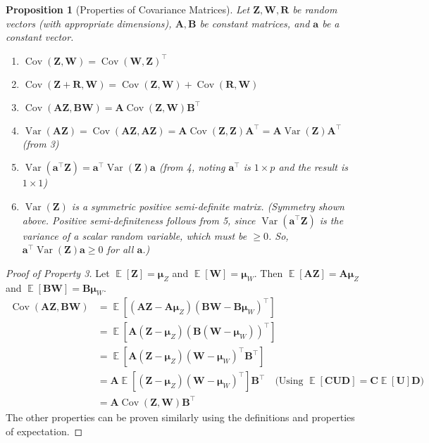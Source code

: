 \documentclass[11pt, a4paper]{article}
\DeclareMathOperator{\E}{\mathbb{E}}             %
\DeclareMathOperator{\Var}{\mathrm{Var}}         %
\DeclareMathOperator{\Cov}{\mathrm{Cov}}         %
\newtheorem{proposition}[theorem]{Proposition}
\theoremstyle{definition}
\theoremstyle{remark}
\newcommand{\mat}[1]{\mathbf{#1}}       %
\newcommand{\vect}[1]{\bm{#1}}          %
\newcommand{\transpose}{^{\top}}        %
\begin{document}
\begin{proposition}[Properties of Covariance Matrices]
Let $\vect{Z}, \vect{W}, \vect{R}$ be random vectors (with appropriate dimensions), $\mat{A}, \mat{B}$ be constant matrices, and $\vect{a}$ be a constant vector.
\begin{enumerate}
    \item $\Cov(\vect{Z}, \vect{W}) = \Cov(\vect{W}, \vect{Z})\transpose$
    \item $\Cov(\vect{Z} + \vect{R}, \vect{W}) = \Cov(\vect{Z}, \vect{W}) + \Cov(\vect{R}, \vect{W})$
    \item $\Cov(\mat{A} \vect{Z}, \mat{B} \vect{W}) = \mat{A} \Cov(\vect{Z}, \vect{W}) \mat{B}\transpose$
    \item $\Var(\mat{A} \vect{Z}) = \Cov(\mat{A}\vect{Z}, \mat{A}\vect{Z}) = \mat{A} \Cov(\vect{Z}, \vect{Z}) \mat{A}\transpose = \mat{A} \Var(\vect{Z}) \mat{A}\transpose$ (from 3)
    \item $\Var(\vect{a}\transpose \vect{Z}) = \vect{a}\transpose \Var(\vect{Z}) \vect{a}$ (from 4, noting $\vect{a}\transpose$ is $1 \times p$ and the result is $1 \times 1$)
    \item $\Var(\vect{Z})$ is a symmetric positive semi-definite matrix. (Symmetry shown above. Positive semi-definiteness follows from 5, since $\Var(\vect{a}\transpose \vect{Z})$ is the variance of a scalar random variable, which must be $\geq 0$. So, $\vect{a}\transpose \Var(\vect{Z}) \vect{a} \geq 0$ for all $\vect{a}$.)
\end{enumerate}
\end{proposition}

\begin{proof}[Proof of Property 3]
Let $\E[\vect{Z}] = \vect{\mu}_Z$ and $\E[\vect{W}] = \vect{\mu}_W$.
Then $\E[\mat{A}\vect{Z}] = \mat{A}\vect{\mu}_Z$ and $\E[\mat{B}\vect{W}] = \mat{B}\vect{\mu}_W$.
\begin{align*} \Cov(\mat{A} \vect{Z}, \mat{B} \vect{W}) &= \E\left[ (\mat{A}\vect{Z} - \mat{A}\vect{\mu}_Z) (\mat{B}\vect{W} - \mat{B}\vect{\mu}_W)\transpose \right] \\ &= \E\left[ \mat{A}(\vect{Z} - \vect{\mu}_Z) ( \mat{B}(\vect{W} - \vect{\mu}_W) )\transpose \right] \\ &= \E\left[ \mat{A}(\vect{Z} - \vect{\mu}_Z) (\vect{W} - \vect{\mu}_W)\transpose \mat{B}\transpose \right] \\ &= \mat{A} \E\left[ (\vect{Z} - \vect{\mu}_Z) (\vect{W} - \vect{\mu}_W)\transpose \right] \mat{B}\transpose \quad \text{(Using } \E[\mat{C}\mat{U}\mat{D}] = \mat{C}\E[\mat{U}]\mat{D} \text{)} \\ &= \mat{A} \Cov(\vect{Z}, \vect{W}) \mat{B}\transpose \end{align*}
The other properties can be proven similarly using the definitions and properties of expectation.
\end{proof}
\end{document}
